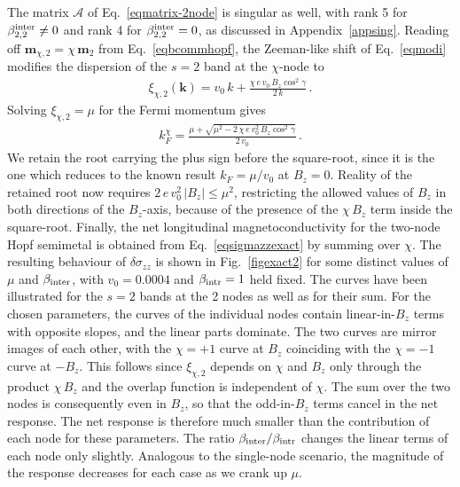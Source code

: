 \documentclass[aps,prb,onecolumn,nofootinbib,citeautoscript,10pt]{revtex4-2}
\begin{document}
The matrix $\mathcal A$ of Eq.~\eqref{eqmatrix-2node} is singular as well, with rank 5 for $\beta^{\rm inter}_{2,2}\neq0$ and rank 4 for $\beta^{\rm inter}_{2,2}=0$, as discussed in Appendix~\ref{appsing}.
Reading off $\boldsymbol m_{\chi,2}=\chi\,\boldsymbol m_2$ from Eq.~\eqref{eqbcommhopf}, the Zeeman-like shift of Eq.~\eqref{eqmodi} modifies the dispersion of the $s=2$ band at the $\chi$-node to
\begin{align}
\label{eqxi-2node}
\xi_{\chi,2}(\boldsymbol k)
= v_0\,k + \frac{\chi\, e\, v_0\, B_z \cos^2\gamma}{2\,k} \,.
\end{align}
Solving $\xi_{\chi,2}=\mu$ for the Fermi momentum gives
\begin{align}
\label{eqkF-2node}
k_F^{\chi}
= \frac{\mu + \sqrt{\mu^2 - 2\,\chi\, e\, v_0^2\, B_z \cos^2\gamma}}{2\,v_0} \,.
\end{align}
We retain the root carrying the plus sign before the square-root, since it is the one which reduces to the known result $k_F=\mu/v_0$ at $B_z=0$. Reality of the retained root now requires $2\,e\,v_0^2\,|B_z| \le \mu^2$, restricting the allowed values of $B_z$ in both directions of the $B_z$-axis, because of the presence of the $\chi \, B_z$ term inside the square-root.
Finally, the net longitudinal magnetoconductivity for the two-node Hopf semimetal is
obtained from Eq.~\eqref{eqsigmazzexact} by summing over $\chi$.
The resulting behaviour of $\delta \sigma_{zz}$ is shown in Fig.~\ref{figexact2} for some distinct values of $\mu$ and $\beta_{\rm inter}$, with $v_0=0.0004$ and $\beta_{\rm intr} = 1$ held fixed. The curves have been illustrated for the $s=2$ bands at the 2 nodes as well as for their sum. For the chosen parameters, the curves of the individual nodes contain linear-in-$B_z$ terms with opposite slopes, and the linear parts dominate. The two curves are mirror images of each other, with the $\chi=+1$ curve at $B_z$ coinciding with the $\chi=-1$ curve at $-B_z$. This follows since $\xi_{\chi,2}$ depends on $\chi$ and $B_z$ only through the product $\chi\,B_z$ and the overlap function is independent of $\chi$. The sum over the two nodes is consequently even in $B_z$, so that the odd-in-$B_z$ terms cancel in the net response. The net response is therefore much smaller than the contribution of each node for these parameters. The ratio $\beta_{\rm inter}/\beta_{\rm intr}$ changes the linear terms of each node only slightly. Analogous to the single-node scenario, the magnitude of the response decreases for each case as we crank up $\mu$.
\end{document}
